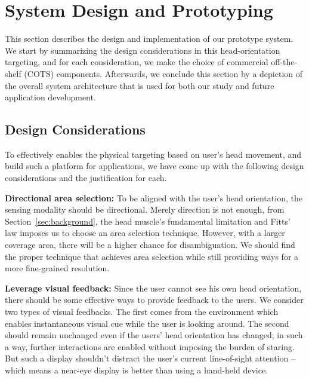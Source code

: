 \section{System Design and Prototyping}
\label{sec:syst-design-prot}

This section describes the design and implementation of our prototype system. We start by summarizing the design considerations in this head-orientation targeting, and for each consideration, we make the choice of commercial off-the-shelf (COTS) components. Afterwards, we conclude this section by a depiction of the overall system architecture that is used for both our study and future application development. 

\subsection{Design Considerations}
\label{sec:design-cons}

To effectively enables the physical targeting based on user's head movement, and build such a platform for applications, we have come up with the following design considerations and the justification for each.

{\bf Directional area selection:} To be aligned with the user's head orientation, the sensing modality should be directional. Merely direction is not enough, from Section~\ref{sec:background}, the head muscle's fundamental limitation and Fitts' law imposes us to choose an area selection technique. However,  with a larger coverage area, there will be a higher chance for disambiguation. We should find the proper technique that achieves area selection while still providing ways for a more fine-grained resolution.

{\bf Leverage visual feedback:} Since the user cannot see his own head orientation, there should be some effective ways to provide feedback to the users. We consider two types of visual feedbacks. The first comes from the environment which enables instantaneous visual cue while the user is looking around. The second should remain unchanged even if the users' head orientation has changed; in such a way, further interactions are enabled without imposing the burden of staring. But such a display shouldn't distract the user's current line-of-sight attention -- which means a near-eye display is better than using a hand-held device. 



